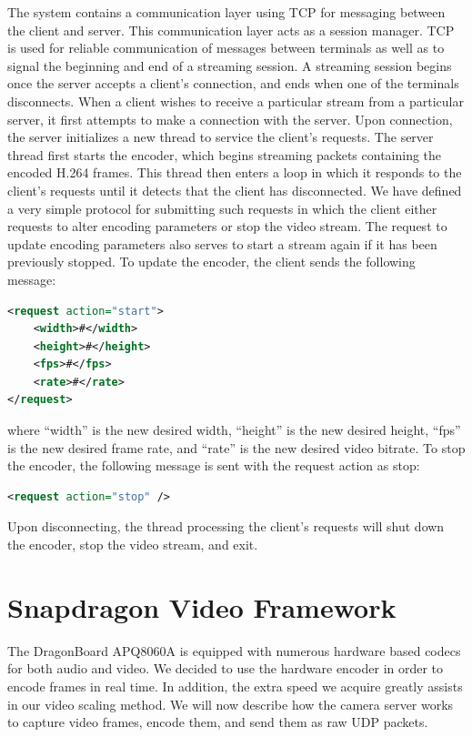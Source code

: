\documentclass[preprint, 12pt]{elsarticle}
\begin{document}
The system contains a communication layer using TCP for messaging between the client and server. This communication layer acts as a session manager. TCP is used for reliable communication of messages between terminals as well as to signal the beginning and end of a streaming session. A streaming session begins once the server accepts a client's connection, and ends when one of the terminals disconnects. When a client wishes to receive a particular stream from a particular server, it first attempts to make a connection with the server. Upon connection, the server initializes a new thread to service the client’s requests. The server thread first starts the encoder, which begins streaming packets containing the encoded H.264 frames. This thread then enters a loop in which it responds to the client's requests until it detects that the client has disconnected. We have defined a very simple protocol for submitting such requests in which the client either requests to alter encoding parameters or stop the video stream. The request to update encoding parameters also serves to start a stream again if it has been previously stopped. To update the encoder, the client sends the following message:
%
\begin{lstlisting}[language=xml, frame=single]
<request action="start">
	<width>#</width>
	<height>#</height>
	<fps>#</fps>
	<rate>#</rate>
</request>
\end{lstlisting}
where ``width'' is the new desired width, ``height'' is the new desired height, ``fps'' is the new desired frame rate, and ``rate'' is the new desired video bitrate. To stop the encoder, the following message is sent with the request action as stop:
%
\begin{lstlisting}[language=xml, frame=single]
<request action="stop" />
\end{lstlisting}
Upon disconnecting, the thread processing the client's requests will shut down the encoder, stop the video stream, and exit.


\section{Snapdragon Video Framework}
\label{sec:Snapdragon}

The DragonBoard APQ8060A is equipped with numerous hardware based codecs for both audio and video. We decided to use the hardware encoder in order to encode frames in real time. In addition, the extra speed we acquire greatly assists in our video scaling method. We will now describe how the camera server works to capture video frames, encode them, and send them as raw UDP packets.
\end{document}
